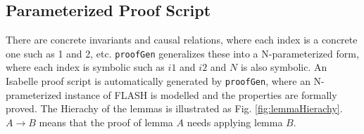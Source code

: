 \documentclass{llncs}
\begin{document}



\subsection{ Parameterized Proof Script}

There are concrete invariants and causal relations, where each  index is a concrete one such as 1 and 2, etc. {\tt proofGen} generalizes these into a N-parameterized form, where each index is symbolic such as $i1$ and $i2$ and $N$ is also symbolic. An Isabelle proof script is automatically generated by {\tt proofGen}, where an N-prameterized instance of FLASH is modelled   and the properties are formally proved. The Hierachy of the lemmas is illustrated as Fig. \ref{fig:lemmaHierachy}. $A \rightarrow B$ means that the proof of lemma $A$ needs applying lemma $B$.
\end{document}
